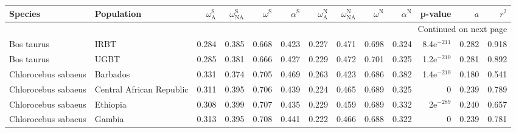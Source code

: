 \begin{longtable}{llrrrrrrrrrrr}
\toprule
             Species &                Population & $\omega_{\textrm{A}}^{\textrm{S}}$ & $\omega_{\textrm{NA}}^{\textrm{S}}$ & $\omega^{\textrm{S}}$ & $\alpha^{\textrm{S}}$ & $\omega_{\textrm{A}}^{\textrm{N}}$ & $\omega_{\textrm{NA}}^{\textrm{N}}$ & $\omega^{\textrm{N}}$ & $\alpha^{\textrm{N}}$ &       p-value &    $a$ &  $r^2$ \\
\midrule
\endhead
\midrule
\multicolumn{13}{r}{{Continued on next page}} \\
\midrule
\endfoot

\bottomrule
\endlastfoot
          Bos taurus &                      IRBT &                              0.284 &                               0.385 &                 0.668 &                 0.423 &                              0.227 &                               0.471 &                 0.698 &                 0.324 & 8.4e$^{-211}$ &  0.282 &  0.918 \\
          Bos taurus &                      UGBT &                              0.285 &                               0.381 &                 0.666 &                 0.427 &                              0.229 &                               0.472 &                 0.701 &                 0.325 & 1.2e$^{-210}$ &  0.281 &  0.892 \\
 Chlorocebus sabaeus &                  Barbados &                              0.331 &                               0.374 &                 0.705 &                 0.469 &                              0.263 &                               0.423 &                 0.686 &                 0.382 & 1.4e$^{-210}$ &  0.180 &  0.541 \\
 Chlorocebus sabaeus &  Central African Republic &                              0.311 &                               0.395 &                 0.706 &                 0.439 &                              0.224 &                               0.465 &                 0.689 &                 0.325 &             0 &  0.239 &  0.789 \\
 Chlorocebus sabaeus &                  Ethiopia &                              0.308 &                               0.399 &                 0.707 &                 0.435 &                              0.229 &                               0.459 &                 0.689 &                 0.332 &   2e$^{-289}$ &  0.240 &  0.657 \\
 Chlorocebus sabaeus &                    Gambia &                              0.313 &                               0.395 &                 0.708 &                 0.441 &                              0.222 &                               0.466 &                 0.688 &                 0.322 &             0 &  0.239 &  0.781 \\

\end{longtable}
